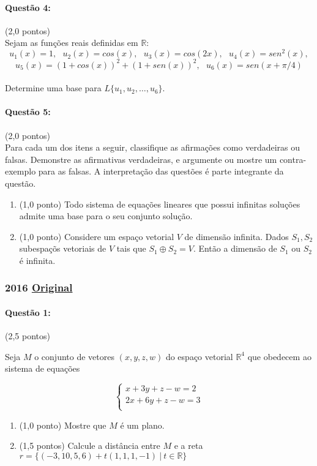 \documentclass[12pt,a4paper]{article}
\newcommand{\original}[1]{\tiny \href{#1}{Original} \normalsize}
\begin{document}
\paragraph{Questão 4:} (2,0 pontos)\\
Sejam as funções reais definidas em $\mathbb{R}$:
$$ u_1(x)=1, \ \ \ u_2(x)=cos(x), \ \ \ u_3(x)=cos(2x), \ \ \ u_4(x)=sen^2(x),$$ $$u_5(x)=(1+cos(x))^2+(1+sen(x))^2, \ \ \ u_6(x)=sen(x+\pi/4)$$\\
Determine uma base para $L\{u_1,u_2,\dots,u_6\}$.
\paragraph{Questão 5:} (2,0 pontos)\\
Para cada um dos itens a seguir, classifique as afirmações como verdadeiras ou falsas. Demonstre as afirmativas verdadeiras, e argumente ou mostre um contra-exemplo para as falsas. A interpretação das questões é parte integrante da questão.

\begin{enumerate}[label=(\alph*)]
\item (1,0 ponto) Todo sistema de equações lineares que possui infinitas soluções admite uma base para o seu conjunto solução.
\item (1,0 ponto) Considere um espaço vetorial $V$ de dimensão infinita. Dados $S_1,S_2$ subespaçõs vetoriais de $V$ tais que $S_1 \oplus S_2 =V$. Então a dimensão de $S_1$ ou $S_2$ é infinita.
\end{enumerate}

\newpage
\subsubsection{2016 \original{https://drive.google.com/file/d/10W6mP98hydnaD-3MjBgYNoRxzbxX9n3q/view?usp=sharing}}

\paragraph{Questão 1:} (2,5 pontos)

Seja $M$ o conjunto de vetores $(x,y,z,w)$ do espaço vetorial $\mathbb{R}^4$ que obedecem ao sistema de equações

$$\begin{cases}
x+3y+z-w=2 \\
2x+6y+z-w=3 \\
\end{cases}$$

\begin{enumerate}[label=(\alph*)]
\item (1,0 ponto) Mostre que $M$ é um plano.
\item (1,5 pontos) Calcule a distância entre $M$ e a reta $r=\{(-3,10,5,6)+t(1,1,1,-1) \ | \ t \in \mathbb{R}\}$
\end{enumerate}
\end{document}
